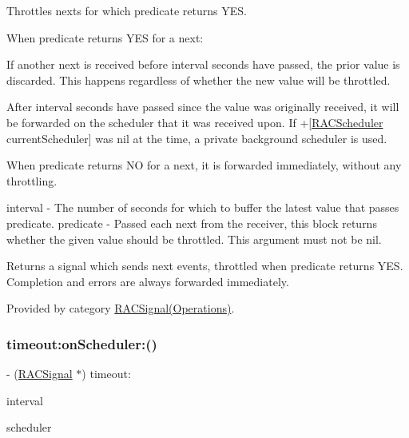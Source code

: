 Throttles {\ttfamily next}s for which {\ttfamily predicate} returns Y\+ES.

When {\ttfamily predicate} returns Y\+ES for a {\ttfamily next}\+:


\begin{DoxyEnumerate}
\item If another {\ttfamily next} is received before {\ttfamily interval} seconds have passed, the prior value is discarded. This happens regardless of whether the new value will be throttled.
\item After {\ttfamily interval} seconds have passed since the value was originally received, it will be forwarded on the scheduler that it was received upon. If +\mbox{[}\mbox{\hyperlink{interface_r_a_c_scheduler}{R\+A\+C\+Scheduler}} current\+Scheduler\mbox{]} was nil at the time, a private background scheduler is used.
\end{DoxyEnumerate}

When {\ttfamily predicate} returns NO for a {\ttfamily next}, it is forwarded immediately, without any throttling.

interval -\/ The number of seconds for which to buffer the latest value that passes {\ttfamily predicate}. predicate -\/ Passed each {\ttfamily next} from the receiver, this block returns whether the given value should be throttled. This argument must not be nil.

Returns a signal which sends {\ttfamily next} events, throttled when {\ttfamily predicate} returns Y\+ES. Completion and errors are always forwarded immediately. 

Provided by category \mbox{\hyperlink{category_r_a_c_signal_07_operations_08_a0310fbee83b4ca1b1daca25daf24f41b}{R\+A\+C\+Signal(\+Operations)}}.

\mbox{\label{interface_r_a_c_signal_a8c5f03f4cc8a132e91a985f3d5ccebc0}} 
\subsubsection{\texorpdfstring{timeout\+:on\+Scheduler\+:()}{timeout:onScheduler:()}\hspace{0.1cm}{\footnotesize\ttfamily [1/3]}}
{\footnotesize\ttfamily -\/ (\mbox{\hyperlink{interface_r_a_c_signal}{R\+A\+C\+Signal}} $\ast$) timeout\+: \begin{DoxyParamCaption}\item[{(N\+S\+Time\+Interval)}]{interval }\item[{onScheduler:(\mbox{\hyperlink{interface_r_a_c_scheduler}{R\+A\+C\+Scheduler}} $\ast$)}]{scheduler }\end{DoxyParamCaption}}


